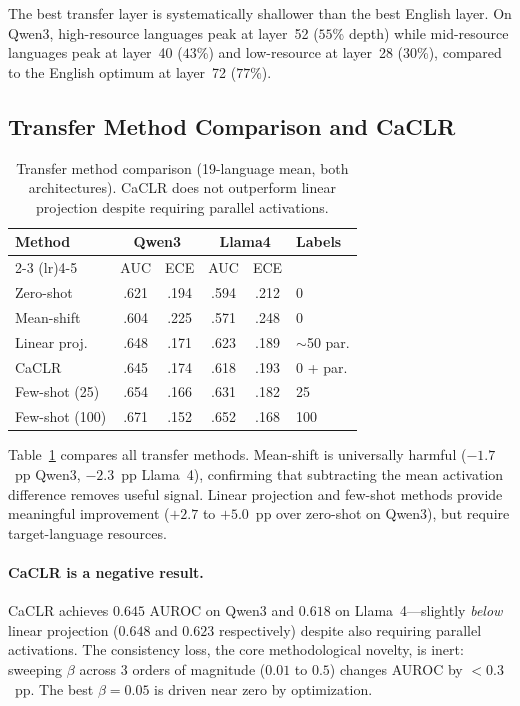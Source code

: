 \documentclass[11pt,a4paper]{article}
\begin{document}
The best transfer layer is systematically shallower than the best English layer.
On Qwen3, high-resource languages peak at layer~52 ($55$\% depth) while mid-resource languages peak at layer~40 ($43$\%) and low-resource at layer~28 ($30$\%), compared to the English optimum at layer~72 ($77$\%).

\subsection{Transfer Method Comparison and CaCLR}

\begin{table}[t]
\centering
\small
\begin{tabular}{lccccl}
\toprule
\textbf{Method} & \multicolumn{2}{c}{\textbf{Qwen3}} & \multicolumn{2}{c}{\textbf{Llama4}} & \textbf{Labels} \\
\cmidrule(lr){2-3} \cmidrule(lr){4-5}
& AUC & ECE & AUC & ECE & \\
\midrule
Zero-shot      & .621 & .194 & .594 & .212 & 0 \\
Mean-shift     & .604 & .225 & .571 & .248 & 0 \\
Linear proj.   & .648 & .171 & .623 & .189 & ${\sim}$50 par. \\
CaCLR          & .645 & .174 & .618 & .193 & 0 + par. \\
Few-shot (25)  & .654 & .166 & .631 & .182 & 25 \\
Few-shot (100) & .671 & .152 & .652 & .168 & 100 \\
\bottomrule
\end{tabular}
\caption{Transfer method comparison (19-language mean, both architectures). CaCLR does not outperform linear projection despite requiring parallel activations.}
\label{tab:transfer_methods}
\end{table}

Table~\ref{tab:transfer_methods} compares all transfer methods.
Mean-shift is universally harmful ($-1.7$~pp Qwen3, $-2.3$~pp Llama~4), confirming that subtracting the mean activation difference removes useful signal.
Linear projection and few-shot methods provide meaningful improvement ($+2.7$ to $+5.0$~pp over zero-shot on Qwen3), but require target-language resources.

\paragraph{CaCLR is a negative result.}
CaCLR achieves $0.645$ AUROC on Qwen3 and $0.618$ on Llama~4---slightly \emph{below} linear projection ($0.648$ and $0.623$ respectively) despite also requiring parallel activations.
The consistency loss, the core methodological novelty, is inert: sweeping $\beta$ across 3 orders of magnitude ($0.01$ to $0.5$) changes AUROC by $< 0.3$~pp.
The best $\beta{=}0.05$ is driven near zero by optimization.
\end{document}
